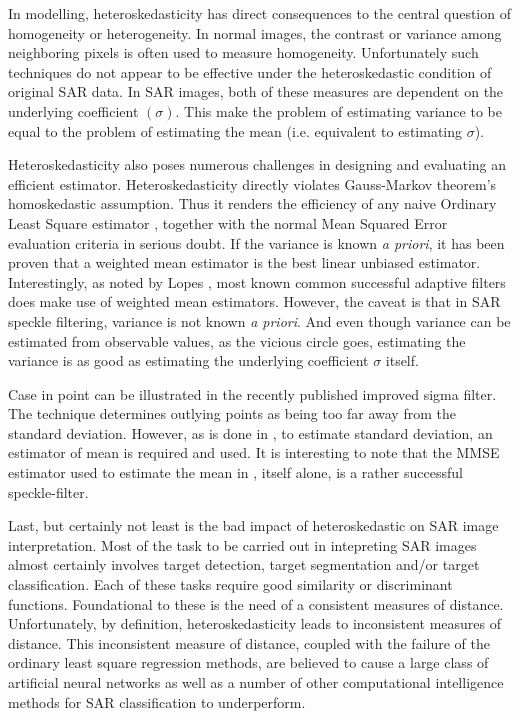 \documentclass[journal]{IEEEtran}
\begin{document}
In modelling, heteroskedasticity has direct consequences to the central question of homogeneity or heterogeneity. 
In normal images, the contrast or variance among neighboring pixels is often used to measure homogeneity. 
Unfortunately such techniques do not appear to be effective under the heteroskedastic condition of original SAR data. 
In SAR images, both of these measures are dependent on the underlying coefficient $(\sigma)$. 
This make the problem of estimating variance to be equal to the problem of estimating the mean (i.e. equivalent 
to estimating $\sigma$).

Heteroskedasticity also poses numerous challenges in designing and evaluating an efficient estimator. 
Heteroskedasticity directly violates Gauss-Markov theorem's homoskedastic assumption. 
Thus it renders the efficiency of any naive Ordinary Least Square estimator \cite{Furno_1991_JStatCompSimul}, 
together with the normal Mean Squared Error evaluation criteria in serious doubt. 
If the variance is known \textit{a priori}, it has been proven that a weighted mean estimator is the 
best linear unbiased estimator. 
Interestingly, as noted by Lopes \cite{Lopes_TGRS_1990}, most known common successful adaptive 
filters \cite{Lee_PAMI_1980} \cite{Kuan_1985_PAMI} \cite{Frost_PAMI_1982} does make use of weighted mean estimators. 
However, the caveat is that in SAR speckle filtering, variance is not known \textit{a priori}. 
And even though variance can be estimated from observable values, as the vicious circle goes, 
estimating the variance is as good as estimating the underlying coefficient $\sigma$ itself.

Case in point can be illustrated in the recently published improved sigma filter\cite{Lee_TGRS_2009}. 
The technique determines outlying points as being too far away from the standard deviation. 
However, as is done in \cite{Lee_TGRS_2009}, to estimate standard deviation, an estimator of mean is required 
and used. It is interesting to note that the MMSE estimator used to estimate the mean 
in \cite{Lee_TGRS_2009}, itself alone, is a rather successful speckle-filter\cite{Lee_PAMI_1980}.

Last, but certainly not least is the bad impact of heteroskedastic on SAR image interpretation. 
Most of the task to be carried out in intepreting SAR images almost certainly involves target detection, 
target segmentation and/or target classification. 
Each of these tasks require good similarity or discriminant functions. 
Foundational to these is the need of a consistent measures of distance. 
Unfortunately, by definition, heteroskedasticity leads to inconsistent measures of distance. 
This inconsistent measure of distance, coupled with the failure of the ordinary least square regression methods, are
 believed to cause a large class of artificial neural networks as well as a number of other computational 
 intelligence methods for SAR classification to underperform.
\end{document}
